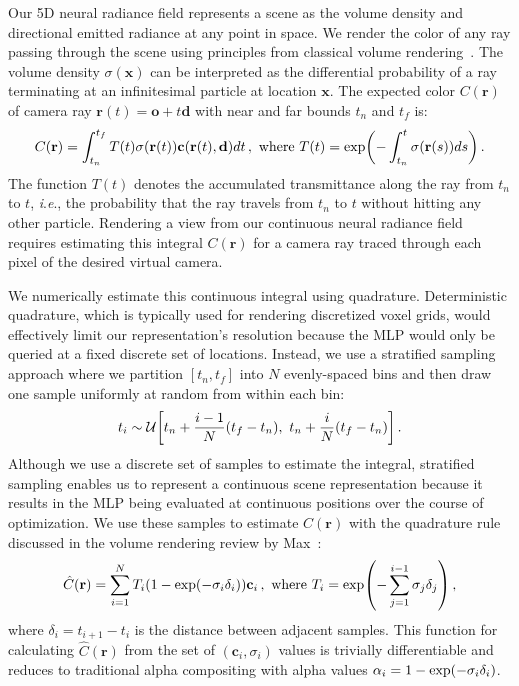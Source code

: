 \documentclass[runningheads]{llncs}
\let\originalleft\left
\let\originalright\right
\renewcommand{\left}{\mathopen{}\mathclose\bgroup\originalleft}
\renewcommand{\right}{\aftergroup\egroup\originalright}
\newcommand{\ie}{\textit{i}.\textit{e}., }
\newcommand{\expo}[1]{\exp\left(#1\right)}
\newcommand{\absrp}{\sigma}
\newcommand{\numsamples}{N}
\newcommand{\timenear}{t_n}
\newcommand{\timefar}{t_f}
\newcommand{\deltatime}{\delta}
\newcommand{\ray}{\mathbf{r}}
\newcommand{\Ctrue}{C(\ray)}
\begin{document}
Our 5D neural radiance field represents a scene as the volume density and directional emitted radiance at any point in space. We render the color of any ray passing through the scene using principles from classical volume rendering~\cite{kajiya84}. The volume density $\sigma(\mathbf{x})$ can be interpreted as the differential probability of a ray terminating at an infinitesimal particle at location $\mathbf{x}$. The expected color $C(\mathbf{r})$ of camera ray $\mathbf{r}(t)=\mathbf{o} + t\mathbf{d}$ with near and far bounds $\timenear$ and $\timefar$ is: 
\begin{equation}
\Ctrue = \int_{\timenear}^{\timefar}T(t)\absrp(\mathbf{r}(t))\mathbf{c}(\mathbf{r}(t),\mathbf{d})dt\,, \textrm{ where }
T(t) = \expo{-\int_{\timenear}^{t}\absrp(\mathbf{r}(s))ds}\,.
\end{equation}
The function $T(t)$ denotes the accumulated transmittance along the ray from $\timenear$ to $t$, \ie the probability that the ray travels from $\timenear$ to $t$ without hitting any other particle. Rendering a view from our continuous neural radiance field requires estimating this integral $\Ctrue$ for a camera ray traced through each pixel of the desired virtual camera.

We numerically estimate this continuous integral using quadrature. Deterministic quadrature, which is typically used for rendering discretized voxel grids, would effectively limit our representation's resolution because the MLP would only be queried at a fixed discrete set of locations. Instead, we use a stratified sampling approach where we partition $[\timenear, \timefar]$ into $\numsamples$ evenly-spaced bins and then draw one sample uniformly at random from within each bin:
\begin{equation}
    t_i \sim \mathcal{U} \left[ \timenear + \frac{i-1}{\numsamples}(\timefar-\timenear),\,\, \timenear + \frac{i}{\numsamples}(\timefar-\timenear) \right]\,.
    \label{eq:stratified}
\end{equation} 
Although we use a discrete set of samples to estimate the integral, stratified sampling enables us to represent a continuous scene representation because it results in the MLP being evaluated at continuous positions over the course of optimization. We use these samples to estimate $\Ctrue$ with the quadrature rule discussed in the volume rendering review by Max~\cite{max95}:
\begin{equation}
\label{eqn:render_coarse}
\hat{C}(\mathbf{r})=\sum_{i=1}^{\numsamples}T_i (1-\expo{-\absrp_i \deltatime_i}) \mathbf{c}_i\,, \textrm{ where }
T_i=\expo{- \sum_{j=1}^{i-1} \absrp_j \deltatime_j}\,,
\end{equation}
where $\deltatime_i = t_{i+1} - t_i $ is the distance between adjacent samples. 
This function for calculating $\hat{C}(\mathbf{r})$ from the set of $(\mathbf{c}_i, \absrp_i)$ values is trivially differentiable and reduces to traditional alpha compositing with alpha values $\alpha_i = 1-\expo{-\absrp_i \deltatime_i}$. 
\end{document}
